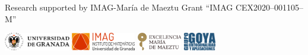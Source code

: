 \documentclass[portrait,final,a0paper,fontscale=0.38]{baposter}
\begin{document}
\begin{poster}
{{Research supported by IMAG-María de Maeztu Grant ``IMAG CEX2020--001105--M''}
\bigskip
\vspace{1pt}
\centerline{
\includegraphics[height=0.8cm]{ugrH} \quad
\includegraphics[height=0.8cm]{IMAG} \quad
\includegraphics[height=0.8cm]{maeztu} \quad
\includegraphics[height=0.8cm]{goya.png}
}

}
\end{poster}
\end{document}
